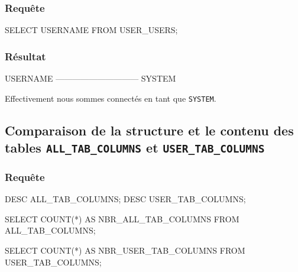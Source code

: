 \documentclass[•]{article}
\begin{document}
\subsubsection{Requête}
\begin{sql}
SELECT USERNAME FROM USER_USERS; 
\end{sql}
\subsubsection{Résultat}
\begin{sql}
 USERNAME
 ------------------------------
 SYSTEM
 
\end{sql}
Effectivement nous sommes connectés en tant que \texttt{SYSTEM}.

\subsection{Comparaison de la structure et le contenu des tables \texttt{ALL\_TAB\_COLUMNS} et \texttt{USER\_TAB\_COLUMNS}}
\subsubsection{Requête}
\begin{sql}
DESC ALL_TAB_COLUMNS;
DESC USER_TAB_COLUMNS;

SELECT COUNT(*) AS NBR_ALL_TAB_COLUMNS 
FROM ALL_TAB_COLUMNS;

SELECT COUNT(*) AS NBR_USER_TAB_COLUMNS 
FROM USER_TAB_COLUMNS;
\end{sql}
\end{document}
